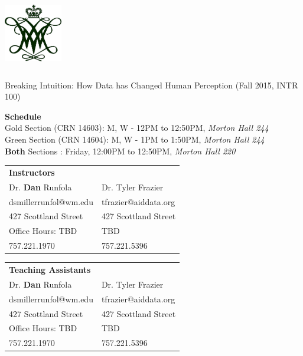 \documentclass[11pt]{article}
\begin{document}
  \begin{center}

{\includegraphics[height=1.25in,width=1in]{wmchiffre1.jpg}} 

\LARGE Breaking Intuition: How Data has Changed Human Perception (Fall 2015, INTR 100)\\ \vspace{3mm}
\end{center}
\large \textbf{Schedule} \\
\normalsize \color{yellow}Gold \color{black} Section (CRN 14603): M, W - 12PM to 12:50PM, \textit{Morton Hall 244} \\
\color{green}Green \color{black} Section (CRN 14604): M, W - 1PM to 1:50PM, \textit{Morton Hall 244} \\
\textbf{Both} \color{black} Sections : Friday, 12:00PM to 12:50PM, \textit{Morton Hall 220} \\
\vspace{2mm}

\begin{table}[ht]
\begin{tabular}{l l}
\large \textbf{Instructors} & \\
\large Dr. \textbf{Dan} Runfola & Dr. Tyler Frazier \\
\large dsmillerrunfol@wm.edu  & tfrazier@aiddata.org \\
\large 427 Scottland Street & 427 Scottland Street \\
\large Office Hours: TBD & TBD \\
\large 757.221.1970 & 757.221.5396 \\
\end{tabular}
\end{table}

\begin{table}[ht]
\begin{tabular}{l l}
\large \textbf{Teaching Assistants} & \\
\large Dr. \textbf{Dan} Runfola & Dr. Tyler Frazier \\
\large dsmillerrunfol@wm.edu  & tfrazier@aiddata.org \\
\large 427 Scottland Street & 427 Scottland Street \\
\large Office Hours: TBD & TBD \\
\large 757.221.1970 & 757.221.5396 \\
\end{tabular}
\end{table}
\end{document}
